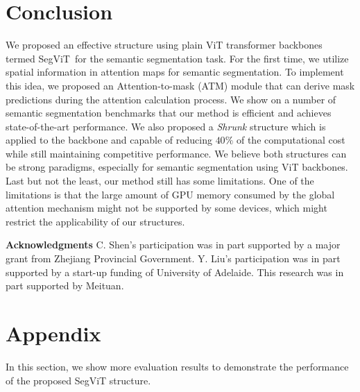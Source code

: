 \documentclass{article}
\makeatletter
\renewcommand{\paragraph}{\@startsection{paragraph}{4}{\z@}{.5ex \@plus 1ex \@minus .2ex}{-1em}{\normalfont\normalsize\bfseries}}
\def\atm{ATM}
\def\seg{SegViT}
\makeatother
\begin{document}
\section{Conclusion}
We proposed an effective structure using plain ViT transformer backbones termed \seg\ for the semantic segmentation task.
For the first time, we utilize spatial information in attention maps for semantic segmentation. To implement this idea, we proposed an Attention-to-mask (\atm) module that can derive mask predictions during the attention calculation process. We show on a number of semantic segmentation benchmarks that our method is efficient and achieves state-of-the-art performance. We also proposed a \emph{Shrunk} structure which is applied to the backbone and capable of reducing $40\%$ of the computational cost while still maintaining competitive performance.  
We believe both structures can be strong paradigms, especially for semantic segmentation using ViT backbones. 
Last but not the least, our method still has some limitations. One of the limitations is that the  large amount of GPU memory consumed by the global attention mechanism might not be supported by some devices, which might restrict the applicability of our structures. 


\textbf{Acknowledgments} 
C. Shen's participation was in part supported by a major grant from Zhejiang Provincial Government.  Y. Liu's participation was in part supported by a start-up funding of  University of Adelaide.  This research was in part supported by Meituan.

\small








\appendix


\section{Appendix}















\paragraph{}
In this section, we show more evaluation results to demonstrate the performance of the proposed SegViT structure.
\end{document}
